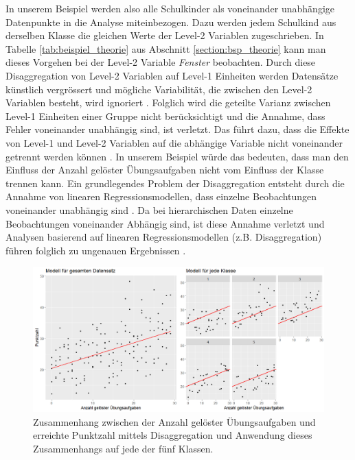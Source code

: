 \documentclass[12pt]{article}\usepackage[]{graphicx}\usepackage[]{color}
\begin{document}
In unserem Beispiel werden also alle Schulkinder als voneinander unabhängige Datenpunkte in die Analyse miteinbezogen. Dazu werden jedem Schulkind aus derselben Klasse die gleichen Werte der Level-2 Variablen zugeschrieben. In Tabelle \ref{tab:beispiel_theorie} aus Abschnitt \ref{section:bsp_theorie} kann man dieses Vorgehen bei der Level-2 Variable \textit{Fenster} beobachten. Durch diese Disaggregation von Level-2 Variablen auf Level-1 Einheiten werden Datensätze künstlich vergrössert und mögliche Variabilität, die zwischen den Level-2 Variablen besteht, wird ignoriert \citep{SnijdersTomA.B2012Ma:a, woltman2012introduction}. Folglich wird die geteilte Varianz zwischen Level-1 Einheiten einer Gruppe nicht berücksichtigt und die Annahme, dass Fehler voneinander unabhängig sind, ist verletzt. Das führt dazu, dass die Effekte von Level-1 und Level-2 Variablen auf die abhängige Variable nicht voneinander getrennt werden können \citep{woltman2012introduction}. In unserem Beispiel würde das bedeuten, dass man den Einfluss der Anzahl gelöster Übungsaufgaben nicht vom Einfluss der Klasse trennen kann. Ein grundlegendes Problem der Disaggregation entsteht durch die Annahme von linearen Regressionsmodellen, dass einzelne Beobachtungen voneinander unabhängig sind \citep{woltman2012introduction}. Da bei hierarchischen Daten einzelne Beobachtungen voneinander Abhängig sind, ist diese Annahme verletzt und Analysen basierend auf linearen Regressionsmodellen (z.B. Disaggregation) führen folglich zu ungenauen Ergebnissen \citep{andrew_data, SnijdersTomA.B2012Ma:a, woltman2012introduction}.

\begin{figure}[t!]
\centering
\includegraphics[width = \textwidth]{./figures/disaggregation_combined}
\caption{Zusammenhang zwischen der Anzahl gelöster Übungsaufgaben und erreichte Punktzahl mittels Disaggregation und Anwendung dieses Zusammenhangs auf jede der fünf Klassen.}
\label{fig:disaggregation}
\end{figure}
\end{document}
